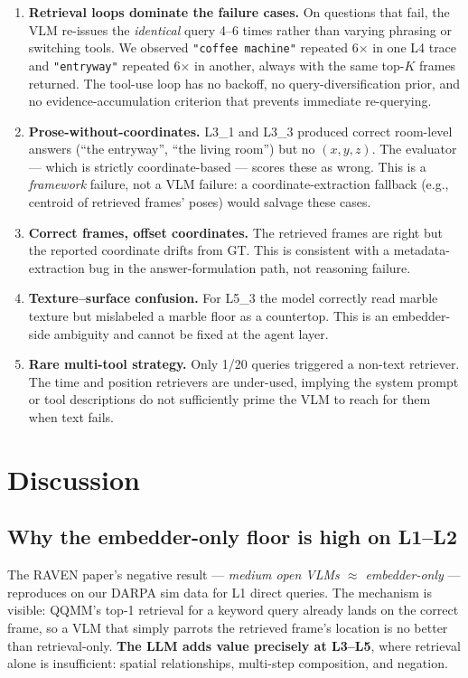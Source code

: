 \documentclass[11pt]{article}
\begin{document}
\begin{enumerate}[leftmargin=*,itemsep=3pt]
  \item \textbf{Retrieval loops dominate the failure cases.} On questions that fail, the VLM re-issues the \emph{identical} query 4--6 times rather than varying phrasing or switching tools. We observed \texttt{"coffee machine"} repeated 6$\times$ in one L4 trace and \texttt{"entryway"} repeated 6$\times$ in another, always with the same top-$K$ frames returned. The tool-use loop has no backoff, no query-diversification prior, and no evidence-accumulation criterion that prevents immediate re-querying.
  \item \textbf{Prose-without-coordinates.} L3\_1 and L3\_3 produced correct room-level answers (``the entryway'', ``the living room'') but no $(x, y, z)$. The evaluator --- which is strictly coordinate-based --- scores these as wrong. This is a \emph{framework} failure, not a VLM failure: a coordinate-extraction fallback (e.g., centroid of retrieved frames' poses) would salvage these cases.
  \item \textbf{Correct frames, offset coordinates.} The retrieved frames are right but the reported coordinate drifts from GT. This is consistent with a metadata-extraction bug in the answer-formulation path, not reasoning failure.
  \item \textbf{Texture--surface confusion.} For L5\_3 the model correctly read marble texture but mislabeled a marble floor as a countertop. This is an embedder-side ambiguity and cannot be fixed at the agent layer.
  \item \textbf{Rare multi-tool strategy.} Only 1/20 queries triggered a non-text retriever. The time and position retrievers are under-used, implying the system prompt or tool descriptions do not sufficiently prime the VLM to reach for them when text fails.
\end{enumerate}

\section{Discussion}

\subsection{Why the embedder-only floor is high on L1--L2}
The RAVEN paper's negative result --- \emph{medium open VLMs $\approx$ embedder-only} --- reproduces on our DARPA sim data for L1 direct queries. The mechanism is visible: QQMM's top-1 retrieval for a keyword query already lands on the correct frame, so a VLM that simply parrots the retrieved frame's location is no better than retrieval-only. \textbf{The LLM adds value precisely at L3--L5}, where retrieval alone is insufficient: spatial relationships, multi-step composition, and negation.
\end{document}
